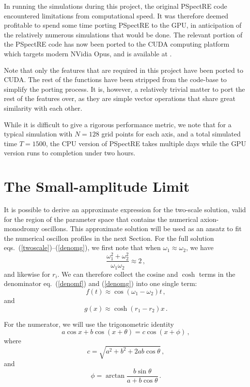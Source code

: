 \documentclass[11pt]{book}
\begin{document}
In running the simulations during this project, the original PSpectRE code encountered limitations from computational speed. It was therefore deemed profitable to spend some time porting PSpectRE to the GPU, in anticipation of the relatively numerous simulations that would be done. The relevant portion of the PSpectRE code has now been ported to the CUDA computing platform which targets modern NVidia Opus, and is available at \cite{cudaport}.

Note that only the features that are required in this project have been ported to CUDA. The rest of the functions have been stripped from the code-base to simplify the porting process. It is, however, a relatively trivial matter to port the rest of the features over, as they are simple vector operations that share great similarity with each other.

While it is difficult to give a rigorous performance metric, we note that for a typical simulation with $N=128$ grid points for each axis, and a total simulated time $T=1500$, the CPU version of PSpectRE takes multiple days while the GPU version runs to completion under two hours.

\section{The Small-amplitude Limit}
It is possible to derive an approximate expression for the two-scale solution, valid for the region of the parameter space that contains the numerical axion-monodromy oscillons. This approximate solution will be used as an ansatz to fit the numerical oscillon profiles in the next Section. For the full solution eqs.~(\ref{twoscale})--(\ref{denomg}), we first note that when $\omega_1\approx\omega_2$, we have
\begin{equation}
  \frac{\omega_1^2+\omega_2^2}{\omega_1 \omega_2} \approx 2\,,
\end{equation}
and likewise for $r_i$. We can therefore collect the cosine and $\cosh$ terms in the denominator eq.~(\ref{denomf}) and (\ref{denomg}) into one single term:
\begin{equation}
  f(t) \approx \cos (\omega_1-\omega_2) t\,,
\end{equation}
and
\begin{equation}
  g(x) \approx \cosh (r_1-r_2) x\,.
\end{equation}

For the numerator, we will use the trigonometric identity
\begin{equation}
  a\cos x + b \cos(x+\theta) = c \cos(x+\phi)\,,
\end{equation}
where
\begin{equation}
  c = \sqrt{a^2+b^2+2ab\cos\theta}\,,
\end{equation}
and
\begin{equation}
  \phi=\arctan \frac{b\sin\theta}{a+b\cos\theta}\,.
\end{equation}
\end{document}
